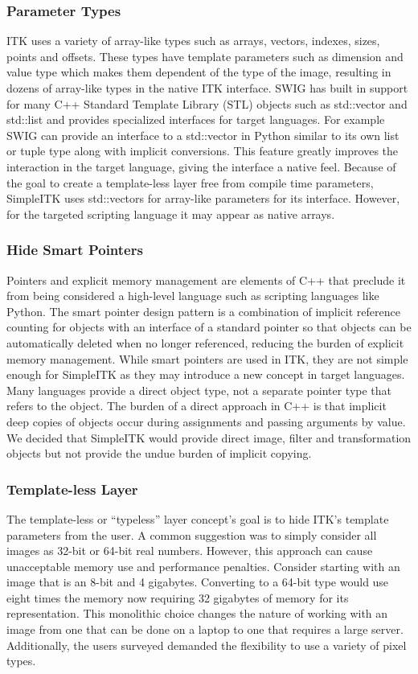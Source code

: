 \documentclass{frontiersMED} %
\begin{document}
\subsubsection{Parameter Types}
ITK uses a variety of array-like types such as arrays, vectors,
indexes, sizes, points and offsets. These types have template
parameters such as dimension and value type which makes them dependent
of the type of the image, resulting in dozens of array-like types in
the native ITK interface. SWIG has built in support for many C++
Standard Template Library (STL) objects such as std::vector and
std::list and provides specialized interfaces for target
languages. For example SWIG can provide an interface to a std::vector
in Python similar to its own list or tuple type along with implicit
conversions. This feature greatly improves the interaction in the
target language, giving the interface a native feel. Because of the
goal to create a template-less layer free from compile time
parameters, SimpleITK uses std::vectors for array-like parameters for
its interface. However, for the targeted scripting language it may
appear as native arrays.

\subsubsection{Hide Smart Pointers}
Pointers and explicit memory management are elements of C++ that
preclude it from being considered a high-level language such as
scripting languages like Python. The smart pointer design pattern is a
combination of implicit reference counting for objects with an
interface of a standard pointer so that objects can be automatically
deleted when no longer referenced, reducing the burden of explicit
memory management. While smart pointers are used in ITK, they are not
simple enough for SimpleITK as they may introduce a new concept in
target languages. Many languages provide a direct object type, not a
separate pointer type that refers to the object. The burden of a
direct approach in C++ is that implicit deep copies of objects occur
during assignments and passing arguments by value. We decided that
SimpleITK would provide direct image, filter and transformation
objects but not provide the undue burden of implicit copying.

\subsubsection{Template-less Layer}
The template-less or “typeless” layer concept's goal is to hide ITK's
template parameters from the user. A common suggestion was to simply
consider all images as 32-bit or 64-bit real numbers. However, this
approach can cause unacceptable memory use and performance
penalties. Consider starting with an image that is an 8-bit and 4
gigabytes.  Converting to a 64-bit type would use eight times the
memory now requiring 32 gigabytes of memory for its
representation. This monolithic choice changes the nature of working
with an image from one that can be done on a laptop to one that
requires a large server. Additionally, the users surveyed demanded the
flexibility to use a variety of pixel types.
\end{document}
